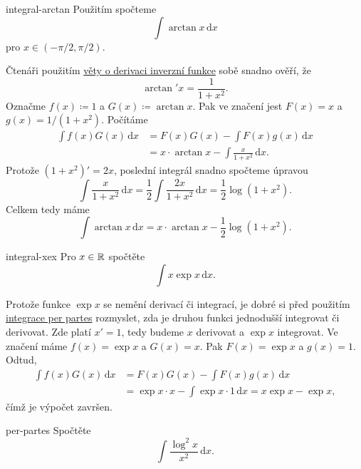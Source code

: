 \begin{example}{}{integral-arctan}
 Použitím  spočteme
 \[
  \int \arctan x \, \mathrm{d}x
 \]
 pro $x \in (-\pi / 2, \pi / 2)$.

 Čtenáři použitím \hyperref[thm:derivace-inverzni-funkce]{věty o derivaci
 inverzní funkce} sobě snadno ověří, že
 \[
  \arctan'x = \frac{1}{1+x^2}.
 \]
 Označme $f(x) \coloneqq 1$ a $G(x) \coloneqq \arctan x$. Pak ve značení
  jest $F(x) = x$ a $g(x) = 1 / (1 +
 x^2)$. Počítáme
 \begin{align*}
  \int f(x)G(x) \, \mathrm{d}x &= F(x)G(x) - \int F(x)g(x) \, \mathrm{d}x\\
                               &= x \cdot \arctan x - \int \frac{x}{1+x^2} \,
                               \mathrm{d}x.
 \end{align*}
 Protože $(1+x^2)' = 2x$, poslední integrál snadno spočteme úpravou
 \[
  \int \frac{x}{1+x^2} \, \mathrm{d}x = \frac{1}{2} \int \frac{2x}{1+x^2} \,
  \mathrm{d}x = \frac{1}{2}\log(1+x^2).
 \]
 Celkem tedy máme
 \[
  \int \arctan x \, \mathrm{d}x = x \cdot \arctan x - \frac{1}{2}\log(1+x^2).
 \]
\end{example}

\begin{problem}{}{integral-xex}
 Pro $x \in \mathbb{R}$ spočtěte
 \[
  \int x\exp x \, \mathrm{d}x.
 \]
\end{problem}
\begin{probsol}
 Protože funkce $\exp x$ se nemění derivací či integrací, je dobré si před
 použitím \hyperref[thm:integrace-per-partes]{integrace per partes} rozmyslet,
 zda je druhou funkci jednodušší integrovat či derivovat. Zde platí $x' = 1$,
 tedy budeme $x$ derivovat a $\exp x$ integrovat. Ve značení
  máme $f(x) = \exp x$ a $G(x) = x$. Pak
 $F(x) = \exp x$ a $g(x) = 1$. Odtud,
 \begin{align*}
  \int f(x) G(x) \, \mathrm{d}x &= F(x)G(x) - \int F(x)g(x) \, \mathrm{d}x\\
                                &= \exp x \cdot x - \int \exp x \cdot 1 \,
                                \mathrm{d}x = x \exp x - \exp x,
 \end{align*}
 čímž je výpočet završen.
\end{probsol}

\begin{exercise}{}{per-partes}
 Spočtěte
 \[
  \int \frac{\log^2 x}{x^2} \, \mathrm{d}x.
 \]
\end{exercise}

